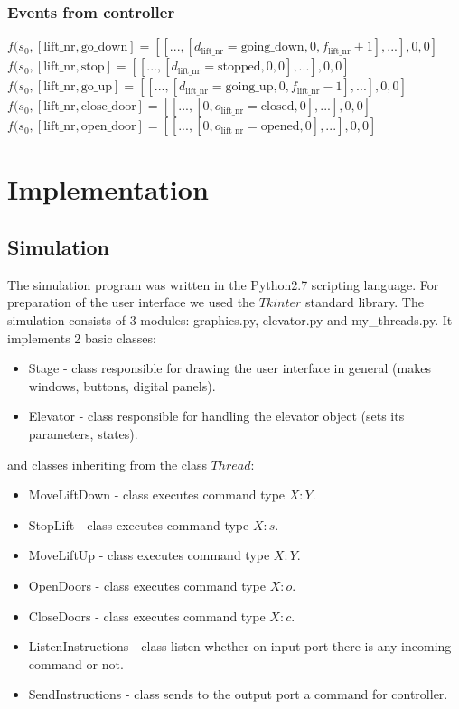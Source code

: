 \documentclass[12pt]{article}
\begin{document}
\subsubsection{Events from controller}
\(
  f(s_0,[\text{lift\_nr},\text{go\_down}] =
  [[...,[d_\text{lift\_nr}=\text{going\_down},0,f_\text{lift\_nr}+1],...],0,0]
\)\\
\(
  f(s_0,[\text{lift\_nr},\text{stop}] =
  [[...,[d_\text{lift\_nr}=\text{stopped},0,0],...],0,0]
\)\\
\(
  f(s_0,[\text{lift\_nr},\text{go\_up}] =
  [[...,[d_\text{lift\_nr}=\text{going\_up},0,f_\text{lift\_nr}-1],...],0,0]
\)\\
\(
  f(s_0,[\text{lift\_nr},\text{close\_door}] =
  [[...,[0,o_\text{lift\_nr}=\text{closed},0],...],0,0]
\)\\
\(
  f(s_0,[\text{lift\_nr},\text{open\_door}] =
  [[...,[0,o_\text{lift\_nr}=\text{opened},0],...],0,0]
\)





\section{Implementation}
\subsection{Simulation}
The simulation program was written in the Python2.7 scripting language. For preparation of the user interface we used the $Tkinter$ standard library. 
The simulation consists of 3 modules: graphics.py, elevator.py and my{\_}threads.py. It implements 2 basic classes:  
\begin{itemize}
 \item Stage - class responsible for drawing the user interface in general (makes windows, buttons, digital panels).
 \item Elevator - class responsible for handling the elevator object (sets its parameters, states). 
\end{itemize}
and classes inheriting from the class $Thread$:
\begin{itemize}
 \item MoveLiftDown - class executes command type $X:Y$.
 \item StopLift - class executes command type $X:s$.
 \item MoveLiftUp - class executes command type $X:Y$.
 \item OpenDoors - class executes command type $X:o$.
 \item CloseDoors - class executes command type $X:c$.
 \item ListenInstructions - class listen whether on input port there is any incoming command or not.
 \item SendInstructions - class sends to the output port a command for controller.
\end{itemize}
\end{document}
